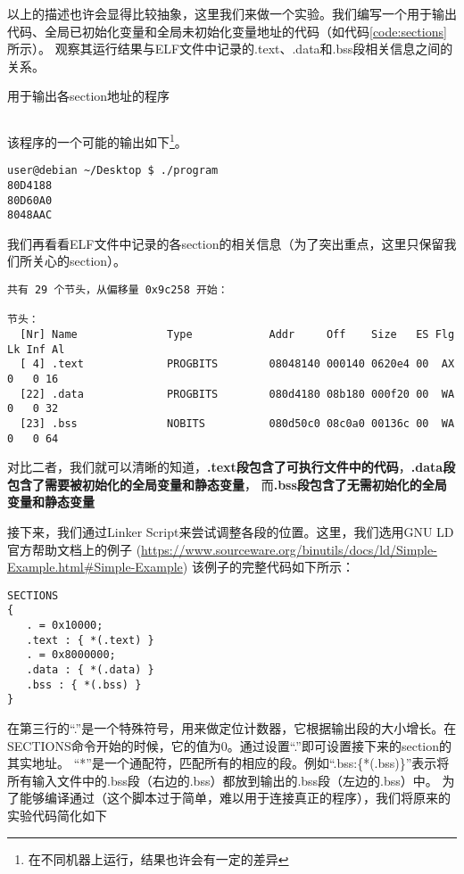 以上的描述也许会显得比较抽象，这里我们来做一个实验。我们编写一个用于输出代码、全局已初始化变量和全局未初始化变量地址的代码（如代码\ref{code:sections}所示）。
观察其运行结果与ELF文件中记录的.text、.data和.bss段相关信息之间的关系。

\begin{codeBoxWithCaption}{用于输出各section地址的程序\label{code:sections}}
  \inputminted[linenos]{c}{codes/sections.c}
\end{codeBoxWithCaption}

该程序的一个可能的输出如下\footnote{在不同机器上运行，结果也许会有一定的差异}。

\begin{verbatim}
user@debian ~/Desktop $ ./program 
80D4188
80D60A0
8048AAC
\end{verbatim}

我们再看看ELF文件中记录的各section的相关信息（为了突出重点，这里只保留我们所关心的section）。

\begin{verbatim}
共有 29 个节头，从偏移量 0x9c258 开始：

节头：
  [Nr] Name              Type            Addr     Off    Size   ES Flg Lk Inf Al
  [ 4] .text             PROGBITS        08048140 000140 0620e4 00  AX  0   0 16
  [22] .data             PROGBITS        080d4180 08b180 000f20 00  WA  0   0 32
  [23] .bss              NOBITS          080d50c0 08c0a0 00136c 00  WA  0   0 64
\end{verbatim}

对比二者，我们就可以清晰的知道，\textbf{.text段包含了可执行文件中的代码}，\textbf{.data段包含了需要被初始化的全局变量和静态变量}，
而\textbf{.bss段包含了无需初始化的全局变量和静态变量}

接下来，我们通过Linker Script来尝试调整各段的位置。这里，我们选用GNU LD官方帮助文档上的例子
(\url{https://www.sourceware.org/binutils/docs/ld/Simple-Example.html#Simple-Example})
该例子的完整代码如下所示：

\begin{verbatim}
SECTIONS
{
   . = 0x10000;
   .text : { *(.text) }
   . = 0x8000000;
   .data : { *(.data) }
   .bss : { *(.bss) }
}
\end{verbatim}

在第三行的“.”是一个特殊符号，用来做定位计数器，它根据输出段的大小增长。在SECTIONS命令开始的时候，它的值为0。通过设置“.”即可设置接下来的section的其实地址。
“*”是一个通配符，匹配所有的相应的段。例如“.bss:\{*(.bss)\}”表示将所有输入文件中的.bss段（右边的.bss）都放到输出的.bss段（左边的.bss）中。
为了能够编译通过（这个脚本过于简单，难以用于连接真正的程序），我们将原来的实验代码简化如下

